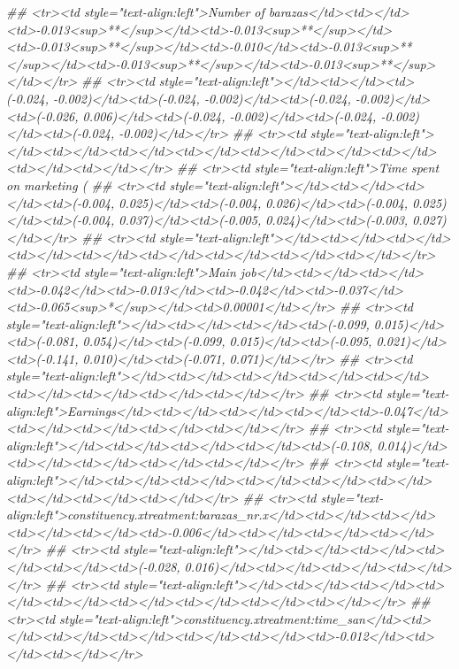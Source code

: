 \documentclass[
]{article}
\newenvironment{Shaded}{\begin{snugshade}}{\end{snugshade}}
\newcommand{\CommentTok}[1]{\textcolor[rgb]{0.56,0.35,0.01}{\textit{#1}}}
\begin{document}
\begin{Shaded}
\begin{Highlighting}[]
{{{{{{{{{{{{{\CommentTok{## <tr><td style="text-align:left">Number of barazas</td><td></td><td>-0.013<sup>**</sup></td><td>-0.013<sup>**</sup></td><td>-0.013<sup>**</sup></td><td>-0.010</td><td>-0.013<sup>**</sup></td><td>-0.013<sup>**</sup></td><td>-0.013<sup>**</sup></td></tr>}
\CommentTok{## <tr><td style="text-align:left"></td><td></td><td>(-0.024, -0.002)</td><td>(-0.024, -0.002)</td><td>(-0.024, -0.002)</td><td>(-0.026, 0.006)</td><td>(-0.024, -0.002)</td><td>(-0.024, -0.002)</td><td>(-0.024, -0.002)</td></tr>}
\CommentTok{## <tr><td style="text-align:left"></td><td></td><td></td><td></td><td></td><td></td><td></td><td></td><td></td></tr>}
\CommentTok{## <tr><td style="text-align:left">Time spent on marketing (%)</td><td></td><td></td><td>0.011</td><td>0.011</td><td>0.011</td><td>0.017</td><td>0.009</td><td>0.012</td></tr>}
\CommentTok{## <tr><td style="text-align:left"></td><td></td><td></td><td>(-0.004, 0.025)</td><td>(-0.004, 0.026)</td><td>(-0.004, 0.025)</td><td>(-0.004, 0.037)</td><td>(-0.005, 0.024)</td><td>(-0.003, 0.027)</td></tr>}
\CommentTok{## <tr><td style="text-align:left"></td><td></td><td></td><td></td><td></td><td></td><td></td><td></td><td></td></tr>}
\CommentTok{## <tr><td style="text-align:left">Main job</td><td></td><td></td><td>-0.042</td><td>-0.013</td><td>-0.042</td><td>-0.037</td><td>-0.065<sup>*</sup></td><td>0.00001</td></tr>}
\CommentTok{## <tr><td style="text-align:left"></td><td></td><td></td><td>(-0.099, 0.015)</td><td>(-0.081, 0.054)</td><td>(-0.099, 0.015)</td><td>(-0.095, 0.021)</td><td>(-0.141, 0.010)</td><td>(-0.071, 0.071)</td></tr>}
\CommentTok{## <tr><td style="text-align:left"></td><td></td><td></td><td></td><td></td><td></td><td></td><td></td><td></td></tr>}
\CommentTok{## <tr><td style="text-align:left">Earnings</td><td></td><td></td><td></td><td>-0.047</td><td></td><td></td><td></td><td></td></tr>}
\CommentTok{## <tr><td style="text-align:left"></td><td></td><td></td><td></td><td>(-0.108, 0.014)</td><td></td><td></td><td></td><td></td></tr>}
\CommentTok{## <tr><td style="text-align:left"></td><td></td><td></td><td></td><td></td><td></td><td></td><td></td><td></td></tr>}
\CommentTok{## <tr><td style="text-align:left">constituency.xtreatment:barazas_nr.x</td><td></td><td></td><td></td><td></td><td>-0.006</td><td></td><td></td><td></td></tr>}
\CommentTok{## <tr><td style="text-align:left"></td><td></td><td></td><td></td><td></td><td>(-0.028, 0.016)</td><td></td><td></td><td></td></tr>}
\CommentTok{## <tr><td style="text-align:left"></td><td></td><td></td><td></td><td></td><td></td><td></td><td></td><td></td></tr>}
\CommentTok{## <tr><td style="text-align:left">constituency.xtreatment:time_san</td><td></td><td></td><td></td><td></td><td></td><td>-0.012</td><td></td><td></td></tr>}
}}}}}}}}}}}}}}
\end{Highlighting}
\end{Shaded}
\end{document}

